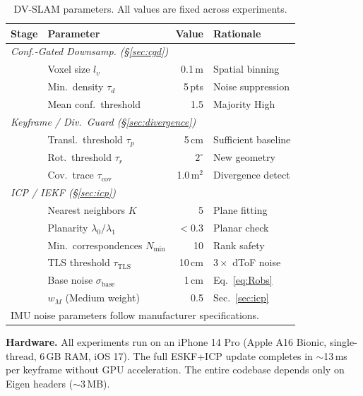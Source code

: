 \documentclass[journal]{IEEEtran}
\begin{document}
\begin{table}[t]
    \centering
    \caption{DV-SLAM parameters. All values are fixed across experiments.}
    \label{tab:parameters}
    \setlength{\tabcolsep}{3pt}
    \footnotesize
    \begin{tabular}{llrl}
        \toprule
        Stage & Parameter & Value & Rationale \\
        \midrule
        \multicolumn{4}{l}{\textit{Conf.-Gated Downsamp. (\S\ref{sec:cgd})}} \\
        & Voxel size $l_v$ & 0.1\,m & Spatial binning \\
        & Min.\ density $\tau_d$ & 5\,pts & Noise suppression \\
        & Mean conf.\ threshold & 1.5 & Majority High \\
        \midrule
        \multicolumn{4}{l}{\textit{Keyframe / Div.\ Guard (\S\ref{sec:divergence})}} \\
        & Transl.\ threshold $\tau_p$ & 5\,cm & Sufficient baseline \\
        & Rot.\ threshold $\tau_r$ & $2^{\circ}$ & New geometry \\
        & Cov.\ trace $\tau_{\text{cov}}$ & 1.0\,m$^2$ & Divergence detect \\
        \midrule
        \multicolumn{4}{l}{\textit{ICP / IEKF (\S\ref{sec:icp})}} \\
        & Nearest neighbors $K$ & 5 & Plane fitting \\
        & Planarity $\lambda_0/\lambda_1$ & $<0.3$ & Planar check \\
        & Min.\ correspondences $N_{\min}$ & 10 & Rank safety \\
        & TLS threshold $\tau_{\text{TLS}}$ & 10\,cm & $3\times$ dToF noise \\
        & Base noise $\sigma_{\text{base}}$ & 1\,cm & Eq.~\eqref{eq:Robs} \\
        & $w_M$ (Medium weight) & 0.5 & Sec.~\ref{sec:icp} \\
        \bottomrule
        \multicolumn{4}{l}{\scriptsize IMU noise parameters follow manufacturer specifications.}
    \end{tabular}
\end{table}

\textbf{Hardware.} All experiments run on an iPhone 14 Pro (Apple A16 Bionic, single-thread, 6\,GB RAM, iOS 17). The full ESKF+ICP update completes in ${\sim}$13\,ms per keyframe without GPU acceleration. The entire codebase depends only on Eigen headers (${\sim}$3\,MB).
\end{document}
